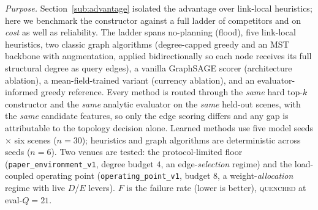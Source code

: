 \documentclass[journal]{IEEEtran}
\newcommand{\qq}{\textsc{quenched}}
\begin{document}
\emph{Purpose.} Section~\ref{sub:advantage} isolated the advantage over link-local
heuristics; here we benchmark the constructor against a full ladder of
competitors and on \emph{cost} as well as reliability. The ladder spans
no-planning (flood), five link-local heuristics, two classic graph algorithms
(degree-capped greedy and an MST backbone with augmentation, applied
bidirectionally so each node receives its full structural degree as query edges),
a vanilla GraphSAGE scorer (architecture ablation), a mean-field-trained variant
(currency ablation), and an evaluator-informed greedy reference. Every method is
routed through the \emph{same} hard top-$k$ constructor and the \emph{same}
analytic evaluator on the \emph{same} held-out scenes, with the \emph{same}
candidate features, so only the edge scoring differs and any gap is attributable
to the topology decision alone. Learned methods use five model seeds $\times$ six
scenes ($n{=}30$); heuristics and graph algorithms are deterministic across seeds
($n{=}6$). Two venues are tested: the protocol-limited floor
(\texttt{paper\_environment\_v1}, degree budget $4$, an edge-\emph{selection}
regime) and the load-coupled operating point (\texttt{operating\_point\_v1},
budget $8$, a weight-\emph{allocation} regime with live $D$/$E$ levers). $F$ is the
failure rate (lower is better), \qq{} at eval-$Q{=}21$.
\end{document}
